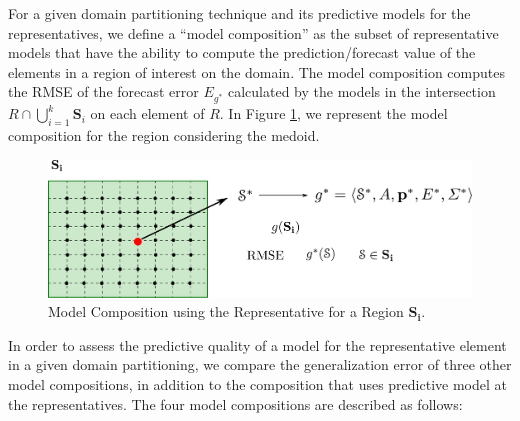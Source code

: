 For a given domain partitioning technique and its predictive models for the representatives, we define a ``model composition'' as the subset of representative models that have the ability to compute the prediction/forecast value of the elements in a region of interest on the domain. The model composition computes the RMSE of the forecast error $E_{g^{*}}$ calculated by the models in the intersection $R \cap \bigcup_{i=1}^{k} \mathbf{S}_{i}$ on each element of $R$.  In Figure \ref{Fig:ModelRegion}, we represent the model composition for the region considering the medoid.
\begin{figure}[h]
	\centering
	\includegraphics[scale=0.35]{../Figures/ModelCompositionRegion}
	\caption{Model Composition using the Representative for a Region $\mathbf{S_{i}}$.}
	\label{Fig:ModelRegion}
\end{figure}

In order to assess the predictive quality of a model for the representative element in a given domain partitioning, we compare the generalization error of three other model compositions, in addition to the composition that uses predictive model at the representatives. The four model compositions are described as follows: 

